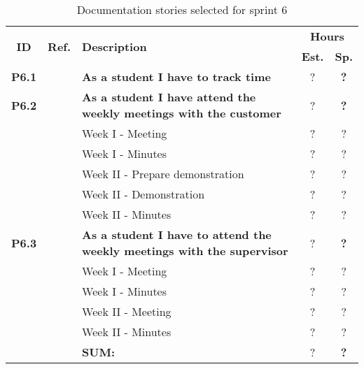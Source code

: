 \def\arraystretch{1.25}
 
\begin{longtable}{ccXcc}
\label{tab:sprint6storiesProcess}\\[-6mm]
\caption{Documentation stories selected for sprint 6}\\[-4mm]

\toprule[0.5mm]
\multirow{2}{*}{\textbf{ID}} &
\multirow{2}{*}{\textbf{Ref.}} & \multirow{2}{*}{\textbf{Description}} & \multicolumn{2}{c}{\textbf{Hours}} \\
 					& & & \textbf{Est.} & \textbf{Sp.} \\

\midrule

\textbf{P6.1} 	&& {\bf  As a student I have to track time} 										& 	?	& \textbf{?} \\
	
\textbf{P6.2} 	&& {\bf As a student I have attend the weekly meetings with the customer} 			& 	?	& \textbf{?} \\
		&& Week I - Meeting							&  ? & ? \\
		&& Week I - Minutes							&  ? & ? \\
		&& Week II - Prepare demonstration			&  ? & ? \\
		&& Week II - Demonstration					&  ? & ? \\
		&& Week II - Minutes						&  ? & ? \\


		
\textbf{P6.3} 	&& {\bf As a student I have to attend the weekly meetings with the supervisor} 		& 	?	& \textbf{?} \\
		&& Week I - Meeting							& ?  & ? \\
		&& Week I - Minutes							& ?  & ? \\
		&& Week II - Meeting						& ?  & ? \\
		&& Week II - Minutes						& ?  & ? \\

				
				
\hline
				&& \textbf{SUM:}		&		?	& \textbf{?}
 \\																			
\bottomrule[0.5mm]
\end{longtable}
